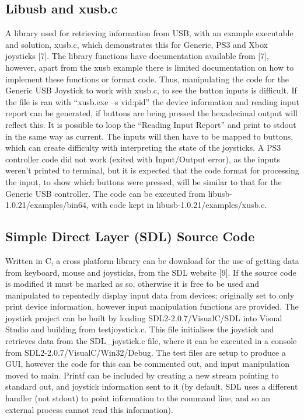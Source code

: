 \documentclass[12pt,openany,a4paper]{book}
\begin{document}
{\subsection{Libusb and xusb.c}
A library used for retrieving information from USB, with an example executable and solution, xusb.c, which demonstrates this for Generic, PS3 and Xbox joysticks [7]. The library functions have documentation available from [7], however, apart from the xusb example there is limited documentation on how to implement these functions or format code. Thus, manipulating the code for the Generic USB Joystick to work with xusb.c, to see the button inputs is difficult. If the file is ran with “xusb.exe –s vid:pid” the device information and reading input report can be generated, if buttons are being pressed the hexadecimal output will reflect this. It is possible to loop the “Reading Input Report” and print to stdout in the same way as current. The inputs will then have to be mapped to buttons, which can create difficulty with interpreting the state of the joysticks. A PS3 controller code did not work (exited with Input/Output error), as the inputs weren’t printed to terminal, but it is expected that the code format for processing the input, to show which buttons were pressed, will be similar to that for the Generic USB controller. The code can be executed from libusb-1.0.21/examples/bin64, with code kept in libusb-1.0.21/examples/xusb.c.

\subsection{Simple Direct Layer (SDL) Source Code}
Written in C, a cross platform library can be download for the use of getting data from keyboard, mouse and joysticks, from the SDL website [9]. If the source code is modified it must be marked as so, otherwise it is free to be used and manipulated to repeatedly display input data from devices; originally set to only print device information, however input manipulation functions are provided. The joystick project can be built by loading SDL2-2.0.7/VisualC/SDL into Visual Studio and building from testjoystick.c. This file initialises the joystick and retrieves data from the SDL\_joystick.c file, where it can be executed in a console from SDL2-2.0.7/VisualC/Win32/Debug. The test files are setup to produce a GUI, however the code for this can be commented out, and input manipulation moved to main. Printf can be included by creating a new stream pointing to standard out, and joystick information sent to it (by default, SDL uses a different handler (not stdout) to point information to the command line, and so an external process cannot read this information).


}
\end{document}
